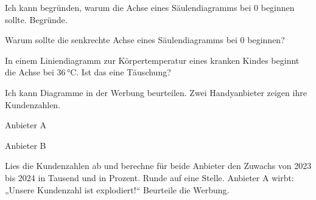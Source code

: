 \begin{aufgabe}{Ich kann begründen, warum die Achse eines Säulendiagramms bei 0 beginnen sollte.}
Begründe.
\begin{teile}
\teil Warum sollte die senkrechte Achse eines Säulendiagramms bei 0 beginnen?
\par\vspace{12mm}
\teil In einem Liniendiagramm zur Körpertemperatur eines kranken Kindes beginnt die Achse bei 36\,°C. Ist das eine Täuschung?
\par\vspace{12mm}
\end{teile}
\end{aufgabe}

\begin{aufgabe}{Ich kann Diagramme in der Werbung beurteilen.}
Zwei Handyanbieter zeigen ihre Kundenzahlen.

\noindent\begin{minipage}[t]{0.48\linewidth}
Anbieter A\par
{}
\end{minipage}\hfill
\begin{minipage}[t]{0.48\linewidth}
Anbieter B\par
{}
\end{minipage}

\begin{teile}
\teil Lies die Kundenzahlen ab und berechne für beide Anbieter den Zuwachs von 2023 bis 2024 in Tausend und in Prozent. Runde auf eine Stelle.
\teil Anbieter A wirbt: „Unsere Kundenzahl ist explodiert!“ Beurteile die Werbung.
\end{teile}
\end{aufgabe}
